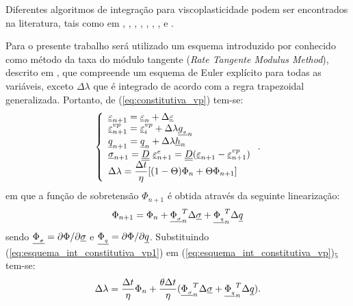 Diferentes algoritmos de integração para viscoplasticidade podem ser encontrados na literatura, tais como em , ,  , , , , ,  e .

Para o presente trabalho será utilizado um esquema introduzido por  conhecido como método da taxa do módulo tangente (\textit{Rate Tangente Modulus Method}), descrito em , que compreende um esquema de Euler explícito para todas as variáveis, exceto $\Delta \lambda$ que é integrado de acordo com a regra trapezoidal generalizada. Portanto, de (\ref{eq:constitutiva_vp}) tem-se:
\begin{equation}
	\label{eq:esquema_int_constitutiva_vp}
	\left\{
	\begin{array}{lcl}
		\underline{\varepsilon}_{n+1} = \underline{\varepsilon}_n + \Delta \underline{\varepsilon} \\
		\underline{\varepsilon}_{n+1}^{vp} = \underline{\varepsilon}_i^{vp} + \Delta \lambda \underline{g_{_\sigma}}_n \\
		\underline q_{n+1} = \underline q_n + \Delta \lambda \underline h_n \\	
		\underline \sigma_{n+1} = \underline{\underline D}~\underline{\varepsilon}_{n+1}^e = \underline{\underline D}(\underline{\varepsilon}_{n+1} - \underline{\varepsilon}_{n+1}^{vp}) \\
		\Delta \lambda = \dfrac{\Delta t}{\eta}[(1-\Theta)\Phi_n + \Theta \Phi_{n+1}]
	\end{array}
	\right..
\end{equation}
em que a função de sobretensão $\Phi_{n+1}$ é obtida através da seguinte linearização:
\begin{equation}
	\label{eq:esquema_int_constitutiva_vp1}
	\Phi_{n+1} = \Phi_n + \underline{\Phi_{_\sigma}}_n^T \Delta \underline \sigma + \underline{\Phi_{_q}}_n^T \Delta \underline q
\end{equation}
sendo $\underline{\Phi_{_\sigma}} = \partial \Phi / \partial \underline \sigma$ e $\underline{\Phi_{_q}} = \partial \Phi / \partial \underline q$. Substituindo (\ref{eq:esquema_int_constitutiva_vp1}) em (\ref{eq:esquema_int_constitutiva_vp})$_5$ tem-se:
\begin{equation}
	\label{eq:esquema_int_constitutiva_vp2}
	\Delta \lambda = \dfrac{\Delta t}{\eta} \Phi_n + \dfrac{\theta \Delta t}{\eta}(\underline{\Phi_{_\sigma}}_n^T \Delta \underline \sigma + \underline{\Phi_{_q}}_n^T \Delta \underline q).
\end{equation}

